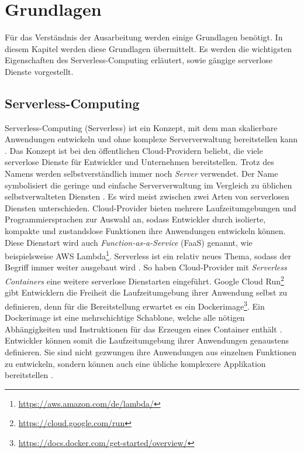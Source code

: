 \chapter{Grundlagen}
Für das Verständnis der Ausarbeitung werden einige Grundlagen benötigt.
In diesem Kapitel werden diese Grundlagen übermittelt.
Es werden die wichtigsten Eigenschaften des Serverless-Computing erläutert,
sowie gängige serverlose Dienste vorgestellt.

\section{Serverless-Computing}
Serverless-Computing (Serverless) ist ein Konzept, mit dem man skalierbare Anwendungen
entwickeln und ohne komplexe Serververwaltung bereitstellen kann \cite{CioGov}.
Das Konzept ist bei den öffentlichen Cloud-Providern beliebt, die viele
serverlose Dienste für Entwickler und Unternehmen bereitstellen. Trotz des Namens
werden selbstverständlich immer noch \emph{Server} verwendet. Der Name symbolisiert die geringe
und einfache Serververwaltung im Vergleich zu üblichen selbstverwalteten
Diensten \cite{CNCF}. Es wird meist zwischen zwei Arten von
serverlosen Diensten unterschieden. Cloud-Provider bieten mehrere
Laufzeitumgebungen und Programmiersprachen zur Auswahl an,
sodass Entwickler durch isolierte, kompakte und zustandslose Funktionen
ihre Anwendungen entwickeln können. Diese Dienstart wird auch
\emph{Function-as-a-Service} (FaaS) genannt, wie beispielsweise
AWS Lambda\footnote{\url{https://aws.amazon.com/de/lambda/}}.
Serverless ist ein relativ neues Thema, sodass
der Begriff immer weiter ausgebaut wird \cite{ServerlessTrends}.
So haben Cloud-Provider mit \emph{Serverless Containers}
eine weitere serverlose Dienstarten eingeführt.
Google Cloud Run\footnote{\url{https://cloud.google.com/run}}
gibt Entwicklern die Freiheit die Laufzeitumgebung ihrer Anwendung
selbst zu definieren, denn für die Bereitstellung erwartet es
ein Dockerimage\footnote{\url{https://docs.docker.com/get-started/overview/}}.
Ein Dockerimage ist eine mehrschichtige Schablone, welche
alle nötigen Abhängigkeiten und Instruktionen für das
Erzeugen eines Container enthält
\cite{DockerDocs} \cite{RedHatDockerImage}.
Entwickler können somit die Laufzeitumgebung ihrer Anwendungen
genaustens definieren. Sie sind nicht gezwungen
ihre Anwendungen aus einzelnen Funktionen zu entwickeln,
sondern können auch eine übliche komplexere Applikation bereitstellen
\cite{ServerlessTrends}.

